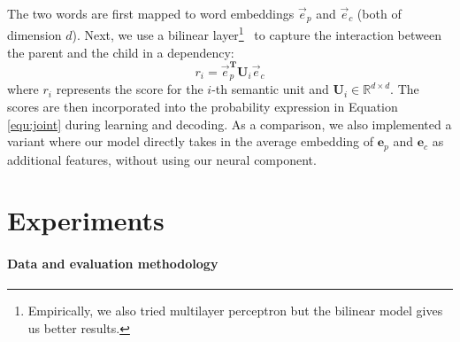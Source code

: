 The two words are first mapped to word embeddings  $\vec{e}_p$ and $\vec{e}_c$ (both of dimension $d$). 
Next, we use a bilinear layer\footnote{Empirically, we also tried multilayer perceptron but the bilinear model gives us better results.}~\cite{socher2013recursive,chen2016thorough} to capture the interaction between the parent and the child in a dependency:
\begin{equation*}
r_i = \vec{e}_p^{\mathbf{T}} \mathbf{U}_i \vec{e}_c
\end{equation*}
where $r_i$ represents the score for the $i$-th semantic unit and $\mathbf{U}_i \in \mathbb{R}^{d\times d}$.
The scores are then incorporated into the probability expression in Equation \ref{equ:joint} during learning and decoding.
As a comparison, we also implemented a  variant where our model directly takes in the average embedding of $\mathbf{e}_p$ and $\mathbf{e}_c$ as additional features, without using our neural component. 







\section{Experiments}

\paragraph{Data and evaluation methodology} 

